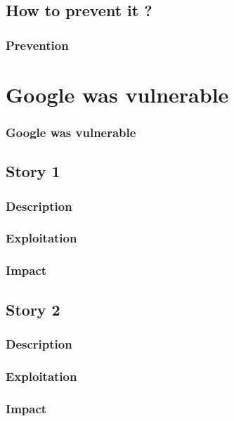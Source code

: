 \documentclass[svgnames]{beamer}
\begin{document}
\subsection{How to prevent it ?}
\begin{frame}
  \frametitle{Prevention} %
\end{frame}




\section{Google was vulnerable}
\begin{frame}
  \frametitle{Google was vulnerable}
  \tableofcontents[currentsection]
\end{frame}

\subsection{Story 1} %

\begin{frame}
  \frametitle{Description}
\end{frame}

\begin{frame}
  \frametitle{Exploitation}
\end{frame}

\begin{frame}
  \frametitle{Impact}
\end{frame}


\subsection{Story 2} %

\begin{frame}
  \frametitle{Description}
\end{frame}

\begin{frame}
  \frametitle{Exploitation}
\end{frame}

\begin{frame}
  \frametitle{Impact}
\end{frame}
\end{document}

